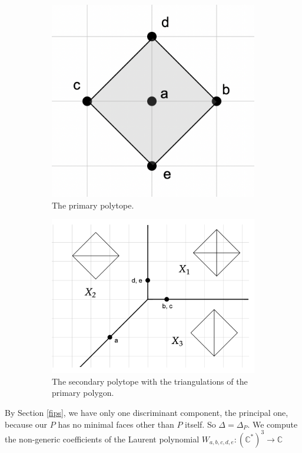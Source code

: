 \documentclass[oneside,reqno]{amsart}
\theoremstyle{definition}
\theoremstyle{definition}
\theoremstyle{definition}
\theoremstyle{definition}
\newcommand{\CC}{\mathbb{C}}
\begin{document}
\begin{figure}[!h]
\centering
\begin{subfigure}{.5\textwidth}
  \centering
  \includegraphics[width=.8\linewidth]{rank2exmp/primarypolygon1.png}
  \caption{The primary polytope.}
  \label{fig:primary}
\end{subfigure}%
\begin{subfigure}{.5\textwidth}
  \centering
  \includegraphics[width=.8\linewidth]{rank2exmp/toricfans1.png}
  \caption{The secondary polytope with the triangulations of the primary polygon. }
  \label{fig:sub2}
\end{subfigure}
\caption{}
\label{fig:test}
\end{figure}
By Section \ref{fips}, we have only one discriminant component, the principal one, because our $P$ has no minimal faces other than $P$ itself. So $\Delta = \Delta_P$. We compute the non-generic coefficients of the Laurent polynomial $W_{a,b,c,d,e} : (\CC^*)^3 \to \CC$
\end{document}

